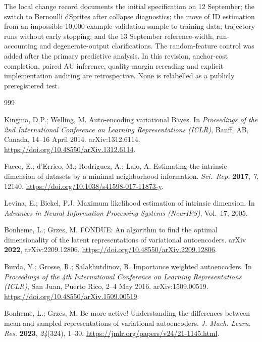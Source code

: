 \documentclass[make,article,submit,pdftex,moreauthors]{Definitions/mdpi}
\begin{document}
The local change record documents the initial specification on
12 September; the switch to Bernoulli dSprites after collapse diagnostics;
the move of ID estimation from an impossible 10,000-example validation
sample to training data; trajectory runs without early stopping; and
the 13 September reference-width, run-accounting and degenerate-output
clarifications. The random-feature control was added after the primary
predictive analysis. In this revision, anchor-cost completion, paired AU
inference, quality-margin rereading and explicit implementation auditing
are retrospective. None is relabelled as a publicly preregistered test.

\begin{thebibliography}{999}

Kingma, D.P.; Welling, M.
Auto-encoding variational Bayes.
In \textit{Proceedings of the 2nd International Conference on Learning
Representations (ICLR)}, Banff, AB, Canada, 14--16 April 2014.
arXiv:1312.6114. \url{https://doi.org/10.48550/arXiv.1312.6114}.

Facco, E.; d'Errico, M.; Rodriguez, A.; Laio, A.
Estimating the intrinsic dimension of datasets by a minimal neighborhood
information.
\textit{Sci.\ Rep.} \textbf{2017}, \textit{7}, 12140.
\url{https://doi.org/10.1038/s41598-017-11873-y}.

Levina, E.; Bickel, P.J.
Maximum likelihood estimation of intrinsic dimension.
In \textit{Advances in Neural Information Processing Systems (NeurIPS)},
Vol.~17, 2005.

Bonheme, L.; Grzes, M.
FONDUE: An algorithm to find the optimal dimensionality of the latent
representations of variational autoencoders.
arXiv \textbf{2022}, arXiv:2209.12806.
\url{https://doi.org/10.48550/arXiv.2209.12806}.

Burda, Y.; Grosse, R.; Salakhutdinov, R.
Importance weighted autoencoders.
In \textit{Proceedings of the 4th International Conference on Learning
Representations (ICLR)}, San Juan, Puerto Rico, 2--4 May 2016.
arXiv:1509.00519. \url{https://doi.org/10.48550/arXiv.1509.00519}.

Bonheme, L.; Grzes, M.
Be more active! Understanding the differences between mean and sampled
representations of variational autoencoders.
\textit{J. Mach. Learn. Res.} \textbf{2023}, \textit{24}(324), 1--30.
\url{https://jmlr.org/papers/v24/21-1145.html}.


\end{thebibliography}
\end{document}
